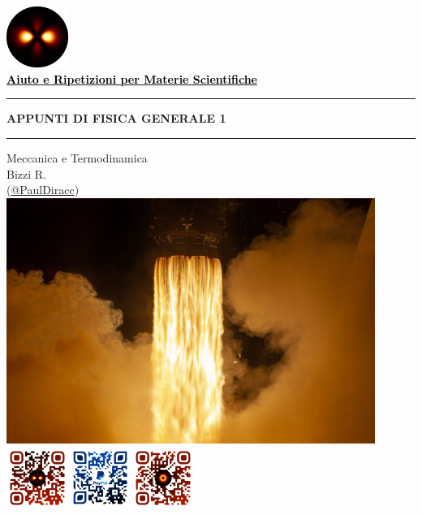 \begin{titlepage}
\begin{center}
\href{\Grouplink}{\includegraphics[width=0.15\textwidth]{../logo.png}}\\
\huge{\textbf{\href{\Grouplink}{
    \textcolor{black}{Aiuto e Ripetizioni per Materie Scientifiche}}}
}\\
\vspace{25mm}
\hrule
\vspace{2.5mm}
\Huge{\textbf{APPUNTI DI FISICA GENERALE 1}}
\vspace{2.5mm}
\hrule
\vspace{3.5mm}
\Large{Meccanica e Termodinamica}
\\[2.5mm]
\normalsize{
    Bizzi R.\\
    \textcolor[RGB]{\hashcolor}{(\href{\Riccardolink}{\textcolor[RGB]{\hashcolor}{@PaulDiracc}})}
}
\\[8mm]
\href{https://www.esa.int/ESA_Multimedia/Images/2021/04/Dragon_fire}{
    \includegraphics[width=0.9\textwidth]{images/cop.jpg}}
\\[15mm]
\href{\Grouplink}{\includegraphics[width=0.15\textwidth]{../QR_group.png}}\qquad
\href{\PayPallink}{\includegraphics[width=0.14\textwidth]{../QR_PayPal.png}}\qquad
\href{\Riccardolink}{\includegraphics[width=0.15\textwidth]{../QR_me.png}}
\end{center}
\end{titlepage}
